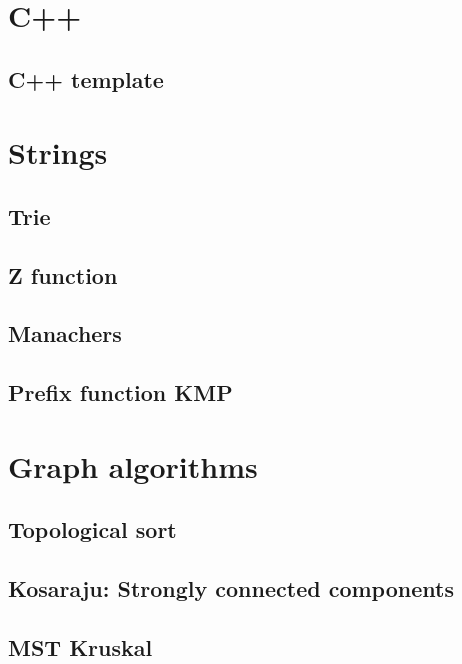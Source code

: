 \section{C++}
\subsection{C++ template}
\raggedbottom
\hrulefill

\section{Strings}
\subsection{Trie}
\raggedbottom
\hrulefill
\subsection{Z function}
\raggedbottom
\hrulefill
\subsection{Manachers}
\raggedbottom
\hrulefill
\subsection{Prefix function KMP}
\raggedbottom
\hrulefill

\section{Graph algorithms}
\subsection{Topological sort}
\raggedbottom
\hrulefill
\subsection{Kosaraju: Strongly connected components}
\raggedbottom
\hrulefill
\subsection{MST Kruskal}
\raggedbottom
\hrulefill

